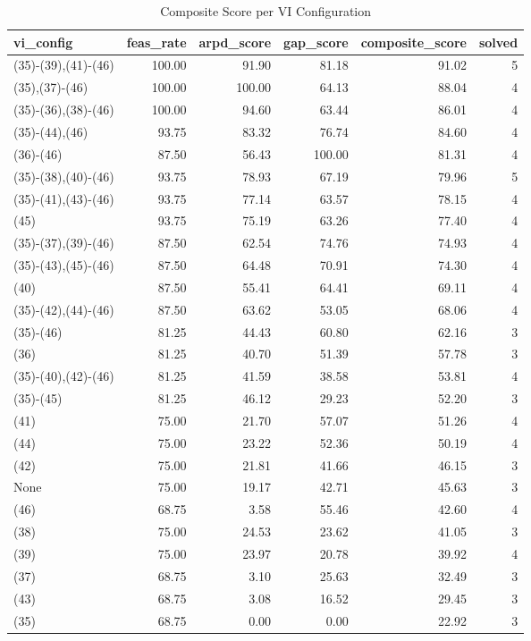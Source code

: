 \begin{table}[ht]
\centering
\begin{tabular}{lrrrrr}
  \hline
vi\_config & feas\_rate & arpd\_score & gap\_score & composite\_score & solved \\ 
  \hline
(35)-(39),(41)-(46) & 100.00 & 91.90 & 81.18 & 91.02 & 5 \\ 
  (35),(37)-(46) & 100.00 & 100.00 & 64.13 & 88.04 & 4 \\ 
  (35)-(36),(38)-(46) & 100.00 & 94.60 & 63.44 & 86.01 & 4 \\ 
  (35)-(44),(46) & 93.75 & 83.32 & 76.74 & 84.60 & 4 \\ 
  (36)-(46) & 87.50 & 56.43 & 100.00 & 81.31 & 4 \\ 
  (35)-(38),(40)-(46) & 93.75 & 78.93 & 67.19 & 79.96 & 5 \\ 
  (35)-(41),(43)-(46) & 93.75 & 77.14 & 63.57 & 78.15 & 4 \\ 
  (45) & 93.75 & 75.19 & 63.26 & 77.40 & 4 \\ 
  (35)-(37),(39)-(46) & 87.50 & 62.54 & 74.76 & 74.93 & 4 \\ 
  (35)-(43),(45)-(46) & 87.50 & 64.48 & 70.91 & 74.30 & 4 \\ 
  (40) & 87.50 & 55.41 & 64.41 & 69.11 & 4 \\ 
  (35)-(42),(44)-(46) & 87.50 & 63.62 & 53.05 & 68.06 & 4 \\ 
  (35)-(46) & 81.25 & 44.43 & 60.80 & 62.16 & 3 \\ 
  (36) & 81.25 & 40.70 & 51.39 & 57.78 & 3 \\ 
  (35)-(40),(42)-(46) & 81.25 & 41.59 & 38.58 & 53.81 & 4 \\ 
  (35)-(45) & 81.25 & 46.12 & 29.23 & 52.20 & 3 \\ 
  (41) & 75.00 & 21.70 & 57.07 & 51.26 & 4 \\ 
  (44) & 75.00 & 23.22 & 52.36 & 50.19 & 4 \\ 
  (42) & 75.00 & 21.81 & 41.66 & 46.15 & 3 \\ 
  None & 75.00 & 19.17 & 42.71 & 45.63 & 3 \\ 
  (46) & 68.75 & 3.58 & 55.46 & 42.60 & 4 \\ 
  (38) & 75.00 & 24.53 & 23.62 & 41.05 & 3 \\ 
  (39) & 75.00 & 23.97 & 20.78 & 39.92 & 4 \\ 
  (37) & 68.75 & 3.10 & 25.63 & 32.49 & 3 \\ 
  (43) & 68.75 & 3.08 & 16.52 & 29.45 & 3 \\ 
  (35) & 68.75 & 0.00 & 0.00 & 22.92 & 3 \\ 
   \hline
\end{tabular}
\caption{Composite Score per VI Configuration} 
\end{table}
